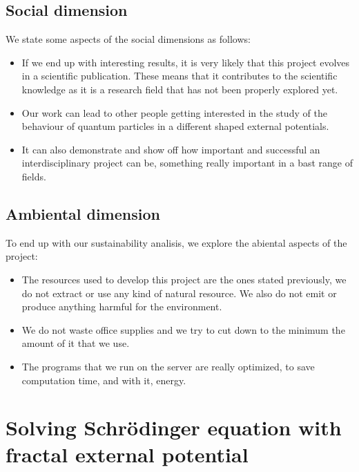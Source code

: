 \documentclass{article}
\begin{document}
\subsection{Social dimension}
We state some aspects of the social dimensions as follows: 
\begin{itemize}
    \item If we end up with interesting results, it is very likely that this project evolves in a scientific publication. These means that it contributes to the scientific knowledge as it is a research field that has not been properly explored yet.
    \item Our work can lead to other people getting interested in the study of the behaviour of quantum particles in a different shaped external potentials.
    \item It can also demonstrate and show off how important and successful an interdisciplinary project can be, something really important in a bast range of fields.
    
\end{itemize}


\subsection{Ambiental dimension}
To end up with our sustainability analisis, we explore the abiental aspects of the project:
\begin{itemize}
    \item The resources used to develop this project are the ones stated previously, we do not extract or use any kind of natural resource. We also do not emit or produce anything harmful for the environment.
    \item We do not waste office supplies and we try to cut down to the minimum the amount of it that we use.
    \item The programs that we run on the server are really optimized, to save computation time, and with it, energy. 
\end{itemize}

\break
\section{Solving Schrödinger equation with fractal external potential}
\end{document}
